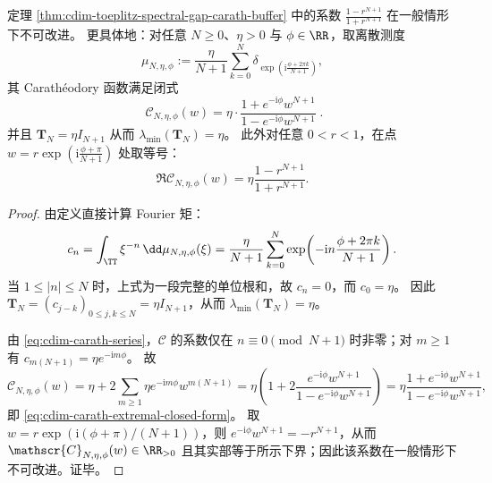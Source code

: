 \begin{proposition}[常数最优性与显式极值构造]\label{prop:cdim-carath-buffer-sharpness}
定理 \ref{thm:cdim-toeplitz-spectral-gap-carath-buffer} 中的系数 \(\frac{1-r^{N+1}}{1+r^{N+1}}\) 在一般情形下不可改进。
更具体地：对任意 \(N\ge 0\)、\(\eta>0\) 与 \(\phi\in\RR\)，取离散测度
\[
\mu_{N,\eta,\phi}:=\frac{\eta}{N+1}\sum_{k=0}^{N}\delta_{\exp\!\left(\mathrm{i}\frac{\phi+2\pi k}{N+1}\right)},
\]
其 Carath\'eodory 函数满足闭式
\begin{equation}\label{eq:cdim-carath-extremal-closed-form}
\boxed{\;
\mathscr{C}_{N,\eta,\phi}(w)=\eta\cdot\frac{1+e^{-\mathrm{i}\phi}w^{N+1}}{1-e^{-\mathrm{i}\phi}w^{N+1}}\; }.
\end{equation}
并且 \(\mathbf{T}_N=\eta I_{N+1}\) 从而 \(\lambda_{\min}(\mathbf{T}_N)=\eta\)。
此外对任意 \(0<r<1\)，在点
\(
w=r\exp\!\left(\mathrm{i}\frac{\phi+\pi}{N+1}\right)
\)
处取等号：
\[
\Re\mathscr{C}_{N,\eta,\phi}(w)=\eta\frac{1-r^{N+1}}{1+r^{N+1}}.
\]
\end{proposition}
\begin{proof}
由定义直接计算 Fourier 矩：
\[
c_n=\int_{\TT}\xi^{-n}\,\dd\mu_{N,\eta,\phi}(\xi)
=\frac{\eta}{N+1}\sum_{k=0}^{N}\exp\!\left(-\mathrm{i}n\frac{\phi+2\pi k}{N+1}\right).
\]
当 \(1\le |n|\le N\) 时，上式为一段完整的单位根和，故 \(c_n=0\)，而 \(c_0=\eta\)。
因此 \(\mathbf{T}_N=(c_{j-k})_{0\le j,k\le N}=\eta I_{N+1}\)，从而 \(\lambda_{\min}(\mathbf{T}_N)=\eta\)。
\par
由 \eqref{eq:cdim-carath-series}，\(\mathscr{C}\) 的系数仅在 \(n\equiv 0\pmod{N+1}\) 时非零；对 \(m\ge 1\) 有
\(
c_{m(N+1)}=\eta e^{-\mathrm{i}m\phi}
\)。
故
\[
\mathscr{C}_{N,\eta,\phi}(w)
=\eta+2\sum_{m\ge 1}\eta e^{-\mathrm{i}m\phi}w^{m(N+1)}
=\eta\left(1+2\frac{e^{-\mathrm{i}\phi}w^{N+1}}{1-e^{-\mathrm{i}\phi}w^{N+1}}\right)
=\eta\frac{1+e^{-\mathrm{i}\phi}w^{N+1}}{1-e^{-\mathrm{i}\phi}w^{N+1}},
\]
即 \eqref{eq:cdim-carath-extremal-closed-form}。
取 \(w=r\exp(\mathrm{i}(\phi+\pi)/(N+1))\)，则 \(e^{-\mathrm{i}\phi}w^{N+1}=-r^{N+1}\)，从而 \(\mathscr{C}_{N,\eta,\phi}(w)\in\RR_{>0}\) 且其实部等于所示下界；因此该系数在一般情形下不可改进。证毕。
\end{proof}

